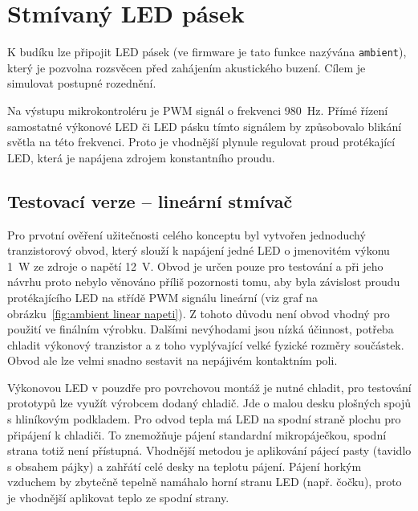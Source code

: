 \section{Stmívaný LED pásek}
K budíku lze připojit LED pásek (ve firmware je tato funkce nazývána
\texttt{ambient}), který je pozvolna rozsvěcen před zahájením akustického
buzení. Cílem je simulovat postupné rozednění.

Na výstupu mikrokontroléru je PWM signál o frekvenci \SI{980}{\hertz}. %
Přímé řízení samostatné výkonové LED či LED pásku tímto signálem by způsobovalo
blikání světla na této frekvenci. Proto je vhodnější plynule regulovat proud
protékající LED, která je napájena zdrojem konstantního proudu.



\subsection{Testovací verze -- lineární stmívač}
Pro prvotní ověření užitečnosti celého konceptu byl vytvořen jednoduchý
tranzistorový obvod, který slouží k napájení jedné LED o jmenovitém výkonu
\SI{1}{\watt} ze zdroje o napětí \SI{12}{\volt}. Obvod je určen pouze pro
testování a při jeho návrhu proto nebylo věnováno příliš pozornosti tomu, aby
byla závislost proudu protékajícího LED na střídě PWM signálu lineární (viz
graf na obrázku~\vref{fig:ambient linear napeti}).
Z tohoto důvodu není obvod vhodný pro použití ve finálním výrobku. Dalšími
nevýhodami jsou nízká účinnost, potřeba chladit výkonový tranzistor a z toho
vyplývající velké fyzické rozměry součástek. Obvod ale lze velmi snadno
sestavit na nepájivém kontaktním poli.

Výkonovou LED v pouzdře pro povrchovou montáž je nutné chladit, pro testování
prototypů lze využít výrobcem dodaný chladič. Jde o malou desku plošných spojů
s hliníkovým podkladem. Pro odvod tepla má LED na spodní straně plochu pro
připájení k chladiči. To znemožňuje pájení standardní mikropáječkou, spodní
strana totiž není přístupná. Vhodnější metodou je aplikování pájecí pasty
(tavidlo s obsahem pájky) a zahřátí celé desky na teplotu pájení. Pájení horkým
vzduchem by zbytečně tepelně namáhalo horní stranu LED (např. čočku), proto je
vhodnější aplikovat teplo ze spodní strany.

